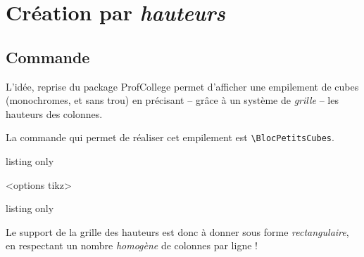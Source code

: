 \documentclass[french,a4paper,11pt]{article}
\begin{document}
\begin{PresCode}{}
\begin{EmpilementCubes}[1.75]
\end{EmpilementCubes}
\end{PresCode}

\pagebreak

\section{Création par \textit{hauteurs}}

\subsection{Commande}

\begin{tipblock}
L'idée, reprise du package \textsf{ProfCollege}\footnotemark{} permet d'afficher une empilement de cubes (monochromes, et sans trou) en précisant -- grâce à un système de \textit{grille} -- les hauteurs des colonnes.

La commande qui permet de réaliser cet empilement est \texttt{\textbackslash BlocPetitsCubes}.
\end{tipblock}

\begin{PresCodeTex}{listing only}
\begin{EmpilementCubes}[échelle]<options tikz>
\end{EmpilementCubes}
\end{PresCodeTex}

\begin{PresCodeTex}{listing only}
\end{PresCodeTex}

\begin{cautionblock}
Le support de la grille des hauteurs est donc à donner sous forme \textit{rectangulaire}, en respectant un nombre \textit{homogène} de colonnes par ligne !
\end{cautionblock}
\end{document}
